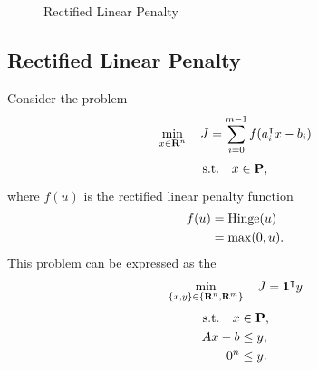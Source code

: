 \documentclass{article}
\begin{document}
    \begin{figure}[b]
        \centering
        \qquad
        \caption{Rectified Linear Penalty}%
        \label{fig:relu}%
    \end{figure}

\subsection{Rectified Linear Penalty}

    Consider the problem
    \begin{align*}
        \min_{x\in\textbf{R}^n}\quad J=\sum_{i=0}^{m-1}f(a_i^\intercal x-b_i)
    \end{align*}
    \begin{align*}
        \text{s.t.}\quad x\in\textbf{P},
    \end{align*}
    where $f(u)$ is the rectified linear penalty function
    \begin{align}
        f(u)&=\text{Hinge}(u)\nonumber\\
        &=\max(0,u).
    \end{align}
    This problem can be expressed as the \LP
    \begin{align*}
        \min_{\{x,y\}\in\{\textbf{R}^n,\textbf{R}^m\}}\quad J=\textbf{1}^\intercal y
    \end{align*}
    \begin{align*}
        \text{s.t.}\quad x &\in \textbf{P},\\
        A x - b &\leq y,\\
        0^n &\leq y.
    \end{align*}
    \\
\end{document}
